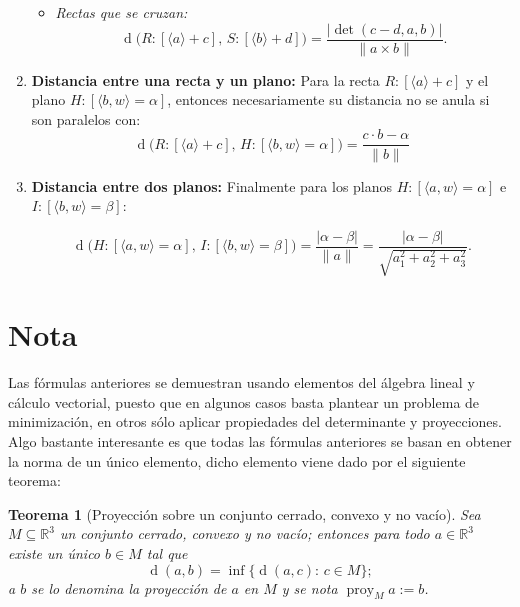 \documentclass[11pt, a4paper]{article} %
\DeclareMathOperator{\proy}{proy}
\DeclareMathOperator{\dd}{d}
\newtheorem{teo}{Teorema}
\begin{document}
\begin{enumerate}[label = \textbf{\arabic*.}]
\begin{itemize}
\item
\emph{Rectas que se cruzan:}
\[
\dd \big(  R: [ \langle a \rangle + c ], \, S : [ \langle b \rangle + d ] \big) =\dfrac{ \big| \det( c-d, a, b ) \big| }{ \| a\times b\| }.
\]

\end{itemize}
			
\item 

\textbf{Distancia entre una recta y un plano:} Para la recta \( R:[\langle a \rangle + c] \) y el plano \( H: [\langle b,w\rangle=\alpha]\), entonces necesariamente su distancia no se anula si son paralelos con:
			\[
				\dd \big(  R: [ \langle a \rangle + c ], \, H : [ \langle b, w \rangle = \alpha ] \big) 
				= 
				\dfrac{c \cdot b - \alpha}{\|b\|}
\]

\item 

\textbf{Distancia entre dos planos:} Finalmente para los planos  \( H:[\langle a,w \rangle = \alpha] \) e  \( I: [\langle b,w\rangle = \beta]\):

			\[
				\dd \big(  H: [ \langle a,w \rangle = \alpha ], \, I : [\langle b,w \rangle = \beta] \big) =
				\dfrac{ | \alpha - \beta | }{\|a\|}
				=
				\dfrac{|\alpha-\beta|}{ \sqrt{a_1^2 + a_2^2 + a_3^2} }.	
			\]

\end{enumerate}

\section*{Nota}

Las fórmulas anteriores se demuestran usando elementos del álgebra lineal y cálculo vectorial, puesto que en algunos casos basta plantear un problema de minimización, en otros sólo aplicar propiedades del determinante y proyecciones. Algo bastante interesante es que todas las fórmulas anteriores se basan en obtener la norma de un único elemento, dicho elemento viene dado por el siguiente teorema:

\begin{teo}[Proyección sobre un conjunto cerrado, convexo y no vacío]
Sea \(M \subseteq \mathbb{R}^3 \) un conjunto cerrado, convexo y no vacío; entonces para todo \( a \in \mathbb{R}^3 \) existe un único \( b \in M \) tal que 
	\[ 
		\dd (a,b) = \inf \big\{ \dd(a,c): \, c \in M  \big\}; 
	\] 
	a \(b\) se lo denomina la \emph{proyección de} \(a\) en \(M\) y se nota \( \proy_M a := b\).
\end{teo}
\end{document}

